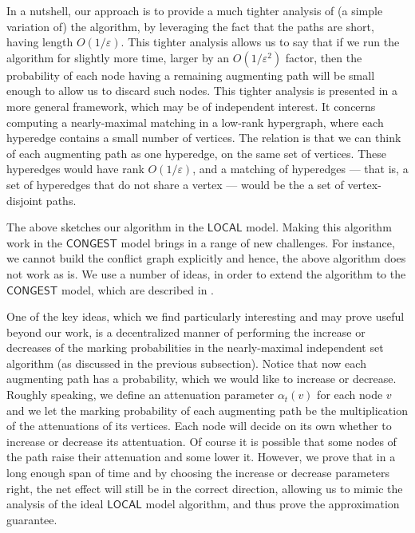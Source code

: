 \documentclass[11pt]{article}
\newcommand{\eps}{\varepsilon}
\begin{document}
In a nutshell, our approach is to provide a much tighter analysis of (a simple variation of) the algorithm, by leveraging the fact that the paths are short, having length $O(1/\eps)$. This tighter analysis allows us to say that if we run the algorithm for slightly more time, larger by an $O(1/\eps^2)$ factor, then the probability of each node having a remaining augmenting path will be small enough to allow us to discard such nodes. This tighter analysis is presented in a more general framework, which may be of independent interest. It concerns computing a nearly-maximal matching in a low-rank hypergraph, where each hyperedge contains a small number of vertices. The relation is that we can think of each augmenting path as one hyperedge, on the same set of vertices. These hyperedges would have rank $O(1/\eps)$, and a matching of hyperedges --- that is, a set of hyperedges that do not share a vertex --- would be the a set of vertex-disjoint paths. 

The above sketches our algorithm in the $\mathsf{LOCAL}$ model. Making this algorithm work in the $\mathsf{CONGEST}$ model brings in a range of new challenges. For instance, we cannot build the conflict graph explicitly and hence, the above algorithm does not work as is. We use a number of ideas, in order to extend the algorithm to the $\mathsf{CONGEST}$ model, which are described in . 

One of the key ideas, which we find particularly interesting and may prove useful beyond our work, is a decentralized manner of performing the increase or decreases of the marking probabilities in the nearly-maximal independent set algorithm (as discussed in the previous subsection). Notice that now each augmenting path has a probability, which we would like to increase or decrease. Roughly speaking, we define an attenuation parameter $\alpha_{t}(v)$ for each node $v$ and we let the marking probability of each augmenting path be the multiplication of the attenuations of its vertices. Each node will decide on its own whether to increase or decrease its attentuation. Of course it is possible that some nodes of the path raise their attenuation and some lower it. However, we prove that in a long enough span of time and by choosing the increase or decrease parameters right, the net effect will still be in the correct direction, allowing us to mimic the analysis of the ideal $\mathsf{LOCAL}$ model algorithm, and thus prove the approximation guarantee.
\end{document}
